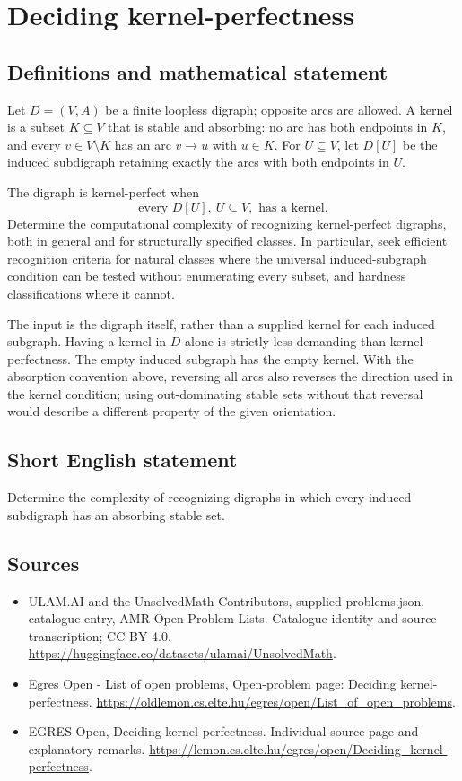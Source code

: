 \documentclass[11pt,a4paper]{article}
\begin{document}
\section*{Deciding kernel-perfectness}\label{statement}

\subsection{Definitions and mathematical statement}
Let $D=(V,A)$ be a finite loopless digraph; opposite arcs are allowed.
A kernel is a subset $K\subseteq V$ that is stable and absorbing:
no arc has both endpoints in $K$, and every $v\in V\setminus K$
has an arc $v\to u$ with $u\in K$. For $U\subseteq V$, let $D[U]$
be the induced subdigraph retaining exactly the arcs with both endpoints
in $U$.

The digraph is kernel-perfect when
\[
                        \text{every }D[U],\ U\subseteq V,
                        \text{ has a kernel}.
\]
Determine the computational complexity of recognizing kernel-perfect
digraphs, both in general and for structurally specified classes.
In particular, seek efficient recognition criteria for natural classes
where the universal induced-subgraph condition can be tested without
enumerating every subset, and hardness classifications where it cannot.

The input is the digraph itself, rather than a supplied kernel for each
induced subgraph. Having a kernel in $D$ alone is strictly less demanding
than kernel-perfectness. The empty induced subgraph has the empty kernel.
With the absorption convention above, reversing all arcs also reverses
the direction used in the kernel condition; using out-dominating stable
sets without that reversal would describe a different property of the
given orientation.
\subsection{Short English statement}
Determine the complexity of recognizing digraphs in which every
induced subdigraph has an absorbing stable set.
\subsection{Sources}
\begin{itemize}
\item[S1] ULAM.AI and the UnsolvedMath Contributors, supplied problems.json, catalogue entry, AMR Open Problem Lists. Catalogue identity and source transcription; CC BY 4.0.
\url{https://huggingface.co/datasets/ulamai/UnsolvedMath}.
\item[S2] Egres Open - List of open problems, Open-problem page: Deciding kernel-perfectness. 
\url{https://oldlemon.cs.elte.hu/egres/open/List_of_open_problems}.
\item[S3] EGRES Open, Deciding kernel-perfectness. Individual source page and explanatory remarks.
\url{https://lemon.cs.elte.hu/egres/open/Deciding_kernel-perfectness}.
\end{itemize}
\end{document}
